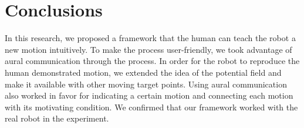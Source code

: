 \vspace{-5mm}
\section{Conclusions}
In this research, we proposed a framework that the human can teach the robot a new motion intuitively. To make the process user-friendly, we took advantage of aural communication through the process. In order for the robot to reproduce the human demonstrated motion, we extended the idea of the potential field and make it available with other moving target points. Using aural communication also worked in favor for indicating a certain motion and connecting each motion with its motivating condition. We confirmed that our framework worked with the real robot in the experiment.

